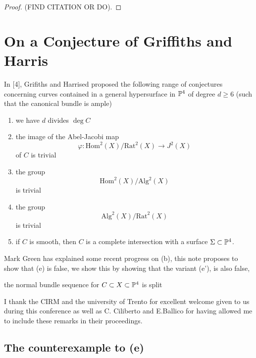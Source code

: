 \documentclass[12pt]{article}
\begin{document}
\begin{proof}
(FIND CITATION OR DO).
\end{proof}

\newpage

\section{On a Conjecture of Griffiths and Harris}

In [4], Grifiths and Harrised proposed the following range of conjectures concerning curves contained in a general hypersurface in $\P^4$ of degree $d \ge 6$ (such that the canonical bundle is ample)
\begin{enumerate}
\item we have $d$ divides $\deg{C}$
\item the image of the Abel-Jacobi map
\[ \varphi : \mathrm{Hom}^2(X) / \mathrm{Rat}^2(X) \to J^2(X) \]
of $C$ is trivial
\item the group
\[ \mathrm{Hom}^2(X) / \mathrm{Alg}^2(X) \]
is trivial
\item the group
\[ \mathrm{Alg}^2(X) / \mathrm{Rat}^2(X) \]
is trivial
\item if $C$ is smooth, then $C$ is a complete intersection with a surface $\Sigma \subset \P^4$. 
\end{enumerate}
Mark Green has explained some recent progress on (b), this note proposes to show that (e) is false, we show this by showing that the variant (e'), is also false,
\begin{center}
the normal bundle sequence for $C \subset X \subset \P^4$ is split
\end{center}
I thank the CIRM and the university of Trento for excellent welcome given to us during this conference as well as C. Ciliberto and E.Ballico for having allowed me to include these remarks in their proceedings.

\subsection{The counterexample to (e)}
\end{document}
